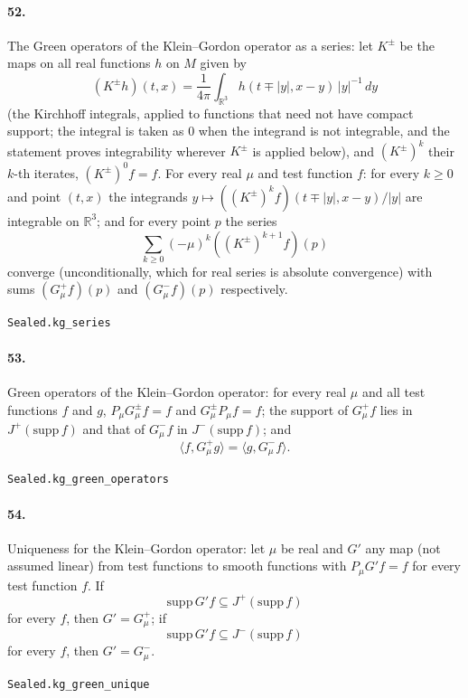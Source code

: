 \documentclass[11pt]{article}
\begin{document}
\paragraph{52.} The Green operators of the Klein–Gordon operator as a series: let $K^\pm$ be the maps on all real functions $h$ on $M$ given by \[(K^\pm h)(t, x) = \frac{1}{4\pi} \int_{\mathbb R^3} h(t \mp |y|, x - y)\, |y|^{-1}\, dy\] (the Kirchhoff integrals, applied to functions that need not have compact support; the integral is taken as $0$ when the integrand is not integrable, and the statement proves integrability wherever $K^\pm$ is applied below), and $(K^\pm)^k$ their $k$-th iterates, $(K^\pm)^0 f = f$. For every real $\mu$ and test function $f$: for every $k \ge 0$ and point $(t, x)$ the integrands $y \mapsto ((K^\pm)^k f)(t \mp |y|, x - y)/|y|$ are integrable on $\mathbb R^3$; and for every point $p$ the series \[\sum_{k \ge 0} (-\mu)^k ((K^\pm)^{k+1} f)(p)\] converge (unconditionally, which for real series is absolute convergence) with sums $(G_\mu^+ f)(p)$ and $(G_\mu^- f)(p)$ respectively.\par{\footnotesize\texttt{Sealed.kg\_series}}

\paragraph{53.} Green operators of the Klein–Gordon operator: for every real $\mu$ and all test functions $f$ and $g$, $P_\mu G_\mu^\pm f = f$ and $G_\mu^\pm P_\mu f = f$; the support of $G_\mu^+ f$ lies in $J^+(\mathrm{supp}\, f)$ and that of $G_\mu^- f$ in $J^-(\mathrm{supp}\, f)$; and \[\langle f, G_\mu^+ g \rangle = \langle g, G_\mu^- f \rangle.\]\par{\footnotesize\texttt{Sealed.kg\_green\_operators}}

\paragraph{54.} Uniqueness for the Klein–Gordon operator: let $\mu$ be real and $G'$ any map (not assumed linear) from test functions to smooth functions with $P_\mu G' f = f$ for every test function $f$. If \[\mathrm{supp}\, G' f \subseteq J^+(\mathrm{supp}\, f)\] for every $f$, then $G' = G_\mu^+$; if \[\mathrm{supp}\, G' f \subseteq J^-(\mathrm{supp}\, f)\] for every $f$, then $G' = G_\mu^-$.\par{\footnotesize\texttt{Sealed.kg\_green\_unique}}
\end{document}
